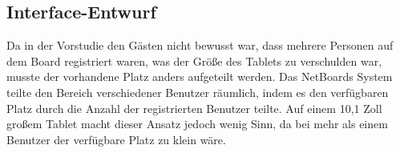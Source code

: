 \subsection{Interface-Entwurf}\label{Interface-Entwurf}
Da in der Vorstudie den Gästen nicht bewusst war, dass mehrere Personen auf dem Board registriert waren, was der Größe des Tablets zu verschulden war, musste der vorhandene Platz anders aufgeteilt werden. Das NetBoards System teilte den Bereich verschiedener Benutzer räumlich, indem es den verfügbaren Platz durch die Anzahl der registrierten Benutzer teilte. Auf einem 10,1 Zoll großem Tablet macht dieser Ansatz jedoch wenig Sinn, da bei mehr als einem Benutzer der verfügbare Platz zu klein wäre.






